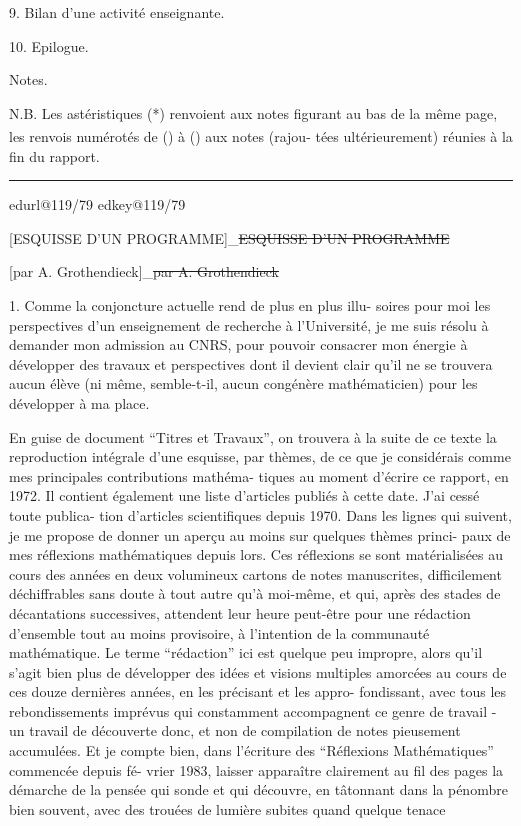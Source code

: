 \documentclass[11pt,a4paper]{article}
\makeatletter
\newif\ifreading
\def\CurrentScanURL{}
\def\CurrentPageKey{}
\def\CurrentApparatus{}
\newcommand{\scanpage}[1]{%
  \clearpage
  \expandafter\let\expandafter\CurrentScanURL\csname edurl@#1\endcsname
  \expandafter\let\expandafter\CurrentPageKey\csname edkey@#1\endcsname
  \def\CurrentApparatus{}%
  \hypertarget{scan-\CurrentPageKey}{}%
  \typeout{EDITION-SCAN: \CurrentPageKey; PDFPAGE: \the\numexpr\ReadonlyShipoutCounter+1\relax}%
  \ifreading
    \marginnote{\raggedright\scriptsize\sffamily\href{\CurrentScanURL}{119 / \csname edpage@#1\endcsname}}%
  \else
    \noindent{\small\sffamily\href{\CurrentScanURL}{[scan #1]}}\par\smallskip
  \fi}
\newcommand{\mspage}[1]{%
  \ifreading\marginnote{\raggedright\scriptsize\sffamily p.\,#1}[2\baselineskip]%
  \else\noindent{\small\sffamily[p.\,#1]}\par\smallskip\fi}
\newcommand{\hand}[1]{\EditionHand{#1}}
\newcommand{\deleted}[1]{\ifmmode\textcolor{DeletionInk}{[#1]_{\scriptscriptstyle\mathrm{del}}}\else\textcolor{DeletionInk}{\sout{#1}}\fi}
\newcommand{\finishscan}{\ifx\CurrentApparatus\empty\else\par\bigskip\noindent\rule{.35\linewidth}{.35pt}\par\smallskip{\footnotesize\setlength{\parskip}{3pt}\CurrentApparatus}\fi}
\makeatother
\begin{document}
9. Bilan d'une activité enseignante.

10. Epilogue.

Notes.

N.B. Les astéristiques (*) renvoient aux notes figurant au bas de
la même page, les renvois numérotés de (\textsuperscript{\hand{1}}) à (\textsuperscript{\hand{7}}) aux notes (rajou-%
tées ultérieurement) réunies à la fin du rapport.

\mspage{\hand{78}}

\finishscan
\scanpage{119/79}
\mspage{1}

\deleted{ESQUISSE D'UN PROGRAMME}

\deleted{par A. Grothendieck}

1. Comme la conjoncture actuelle rend de plus en plus illu-%
soires pour moi les perspectives d'un enseignement de recherche à
l'Université, je me suis résolu à demander mon admission au CNRS, pour
pouvoir consacrer mon énergie à développer des travaux et perspectives
dont il devient clair qu'il ne se trouvera aucun élève (ni même,
semble-t-il, aucun congénère mathématicien) pour les développer à ma
place.

En guise de document ``Titres et Travaux'', on trouvera à la
suite de ce texte la reproduction intégrale d'une esquisse, par thèmes,
de ce que je considérais comme mes principales contributions mathéma-%
tiques au moment d'écrire ce rapport, en 1972. Il contient également
une liste d'articles publiés à cette date. J'ai cessé toute publica-%
tion d'articles scientifiques depuis 1970. Dans les lignes qui suivent,
je me propose de donner un aperçu au moins sur quelques thèmes princi-%
paux de mes réflexions mathématiques depuis lors. Ces réflexions se
sont matérialisées au cours des années en deux volumineux cartons de
notes manuscrites, difficilement déchiffrables sans doute à tout autre
qu'à moi-même, et qui, après des stades de décantations successives,
attendent leur heure peut-être pour une rédaction d'ensemble tout au
moins provisoire, à l'intention de la communauté mathématique. Le
terme ``rédaction'' ici est quelque peu impropre, alors qu'il s'agit
bien plus de développer des idées et visions multiples amorcées au
cours de ces douze dernières années, en les précisant et les appro-%
fondissant, avec tous les rebondissements imprévus qui constamment
accompagnent ce genre de travail - un travail de découverte donc, et
non de compilation de notes pieusement accumulées. Et je compte bien,
dans l'écriture des ``Réflexions Mathématiques'' commencée depuis fé-%
vrier 1983, laisser apparaître clairement au fil des pages la démarche
de la pensée qui sonde et qui découvre, en tâtonnant dans la pénombre
bien souvent, avec des trouées de lumière subites quand quelque tenace
\end{document}
